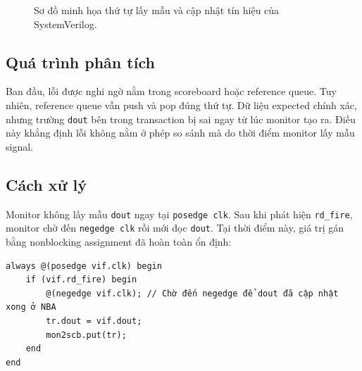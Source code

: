 \documentclass[12pt, a4paper]{article}
\begin{document}
\begin{figure}[H]
\centering
{}
\caption{Sơ đồ minh họa thứ tự lấy mẫu và cập nhật tín hiệu của SystemVerilog.}
\label{fig:log01_b}
\end{figure}

\subsection*{Quá trình phân tích}
Ban đầu, lỗi được nghi ngờ nằm trong scoreboard hoặc reference queue. Tuy nhiên, reference queue vẫn push và pop đúng thứ tự. Dữ liệu expected chính xác, nhưng trường \texttt{dout} bên trong transaction bị sai ngay từ lúc monitor tạo ra. Điều này khẳng định lỗi không nằm ở phép so sánh mà do thời điểm monitor lấy mẫu signal.

\subsection*{Cách xử lý}

Monitor không lấy mẫu \texttt{dout} ngay tại \texttt{posedge clk}. Sau khi phát hiện \texttt{rd\_fire}, monitor chờ đến \texttt{negedge clk} rồi mới đọc \texttt{dout}. Tại thời điểm này, giá trị gán bằng nonblocking assignment đã hoàn toàn ổn định:

\begin{codebox}
\begin{verbatim}
always @(posedge vif.clk) begin
    if (vif.rd_fire) begin
        @(negedge vif.clk); // Chờ đến negedge để dout đã cập nhật xong ở NBA
        tr.dout = vif.dout;
        mon2scb.put(tr);
    end
end
\end{verbatim}
\end{codebox}
\end{document}
